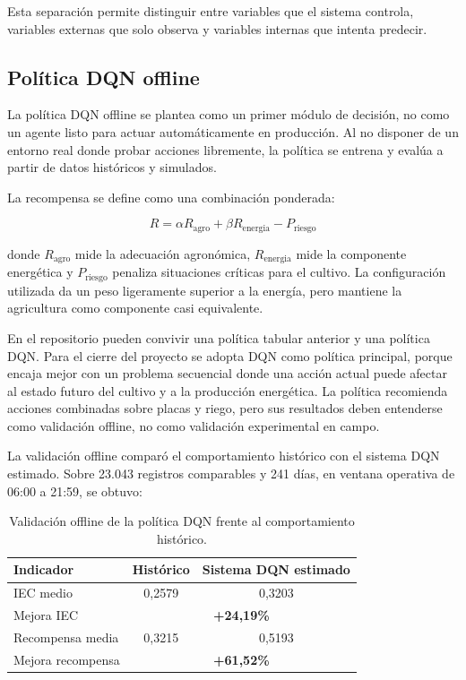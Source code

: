 ﻿\documentclass[11pt,a4paper]{article}
\newcommand{\metric}[1]{\textbf{\color{brandblue}#1}}
\begin{document}
Esta separación permite distinguir entre variables que el sistema controla, variables externas que solo observa y variables internas que intenta predecir.

\subsection{Política DQN offline}

La política DQN offline se plantea como un primer módulo de decisión, no como un agente listo para actuar automáticamente en producción. Al no disponer de un entorno real donde probar acciones libremente, la política se entrena y evalúa a partir de datos históricos y simulados.

La recompensa se define como una combinación ponderada:

\[
R = \alpha R_{\text{agro}} + \beta R_{\text{energia}} - P_{\text{riesgo}}
\]

donde $R_{\text{agro}}$ mide la adecuación agronómica, $R_{\text{energia}}$ mide la componente energética y $P_{\text{riesgo}}$ penaliza situaciones críticas para el cultivo. La configuración utilizada da un peso ligeramente superior a la energía, pero mantiene la agricultura como componente casi equivalente.

En el repositorio pueden convivir una política tabular anterior y una política DQN. Para el cierre del proyecto se adopta DQN como política principal, porque encaja mejor con un problema secuencial donde una acción actual puede afectar al estado futuro del cultivo y a la producción energética. La política recomienda acciones combinadas sobre placas y riego, pero sus resultados deben entenderse como validación offline, no como validación experimental en campo.

La validación offline comparó el comportamiento histórico con el sistema DQN estimado. Sobre 23.043 registros comparables y 241 días, en ventana operativa de 06:00 a 21:59, se obtuvo:

\begin{table}[H]
\centering
\caption{Validación offline de la política DQN frente al comportamiento histórico.}
\begin{tabular}{lcc}
\toprule
\textbf{Indicador} & \textbf{Histórico} & \textbf{Sistema DQN estimado} \\
\midrule
IEC medio & 0,2579 & 0,3203 \\
Mejora IEC & \multicolumn{2}{c}{\metric{+24,19\%}} \\
Recompensa media & 0,3215 & 0,5193 \\
Mejora recompensa & \multicolumn{2}{c}{\metric{+61,52\%}} \\
\bottomrule
\end{tabular}
\end{table}
\end{document}
